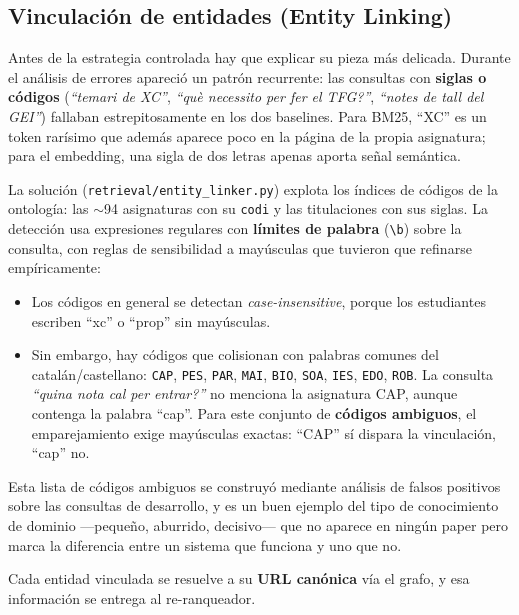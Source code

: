 \documentclass[12pt, a4paper, twoside]{report}
\begin{document}
\subsection{Vinculaci\'on de entidades (Entity Linking)}
\label{sec:entity-linking}

Antes de la estrategia controlada hay que explicar su pieza m\'as delicada. Durante el an\'alisis de errores apareci\'o un patr\'on recurrente: las consultas con \textbf{siglas o c\'odigos} (\textit{``temari de XC''}, \textit{``qu\`e necessito per fer el TFG?''}, \textit{``notes de tall del GEI''}) fallaban estrepitosamente en los dos baselines. Para BM25, ``XC'' es un token rar\'isimo que adem\'as aparece poco en la p\'agina de la propia asignatura; para el embedding, una sigla de dos letras apenas aporta se\~nal sem\'antica.

La soluci\'on (\texttt{retrieval/entity\_linker.py}) explota los \'indices de c\'odigos de la ontolog\'ia: las $\sim$94 asignaturas con su \texttt{codi} y las titulaciones con sus siglas. La detecci\'on usa expresiones regulares con \textbf{l\'imites de palabra} (\verb|\b|) sobre la consulta, con reglas de sensibilidad a may\'usculas que tuvieron que refinarse emp\'iricamente:

\begin{itemize}
  \item Los c\'odigos en general se detectan \textit{case-insensitive}, porque los estudiantes escriben ``xc'' o ``prop'' sin may\'usculas.
  \item Sin embargo, hay c\'odigos que colisionan con palabras comunes del catal\'an/castellano: \texttt{CAP}, \texttt{PES}, \texttt{PAR}, \texttt{MAI}, \texttt{BIO}, \texttt{SOA}, \texttt{IES}, \texttt{EDO}, \texttt{ROB}. La consulta \textit{``quina nota cal per entrar?''} no menciona la asignatura CAP, aunque contenga la palabra ``cap''. Para este conjunto de \textbf{c\'odigos ambiguos}, el emparejamiento exige may\'usculas exactas: ``CAP'' s\'i dispara la vinculaci\'on, ``cap'' no.
\end{itemize}

Esta lista de c\'odigos ambiguos se construy\'o mediante an\'alisis de falsos positivos sobre las consultas de desarrollo, y es un buen ejemplo del tipo de conocimiento de dominio ---peque\~no, aburrido, decisivo--- que no aparece en ning\'un paper pero marca la diferencia entre un sistema que funciona y uno que no.

Cada entidad vinculada se resuelve a su \textbf{URL can\'onica} v\'ia el grafo, y esa informaci\'on se entrega al re-ranqueador.
\end{document}
